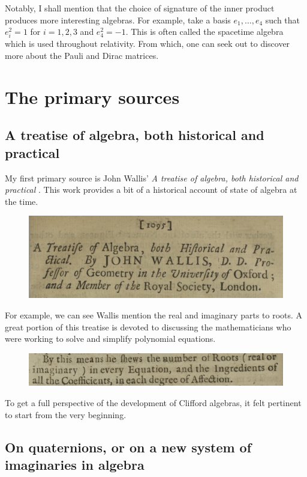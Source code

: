 \documentclass[12pt]{article}
\begin{document}
Notably, I shall mention that the choice of signature of the inner product produces more interesting algebras. For example, take a basis $e_1,\dots, e_4$ such that $e_i^2=1$ for $i=1,2,3$ and $e_4^2=-1$. This is often called the spacetime algebra which is used throughout relativity. From which, one can seek out to discover more about the Pauli and Dirac matrices.

\newpage

\section{The primary sources}

\subsection{A treatise of algebra, both historical and practical}

My first primary source is John Wallis' \emph{A treatise of algebra, both historical and practical} \cite{wallis_treatise_1685}.  This work provides a bit of a historical account of state of algebra at the time.

\begin{figure}[H]
    \centering
    \includegraphics[width=.6\textwidth]{figures/wallis_title.png}
\end{figure}

For example, we can see Wallis mention the real and imaginary parts to roots. A great portion of this treatise is devoted to discussing the mathematicians who were working to solve and simplify polynomial equations.

\begin{figure}[H]
    \centering
    \includegraphics[width=.6\textwidth]{figures/wallis_imaginary.png}
\end{figure}

To get a full perspective of the development of Clifford algebras, it felt pertinent to start from the very beginning.

\newpage
\subsection{On quaternions, or on a new system of imaginaries in algebra}
\end{document}
